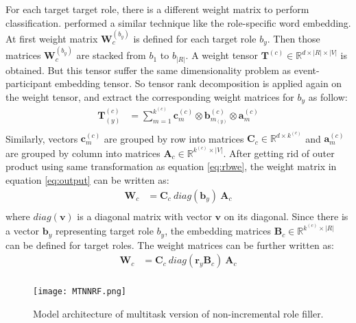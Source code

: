 \documentclass[a4paper]{article}
\begin{document}
For each target target role, there is a different weight matrix to perform classification. \citet{tilk2016event} performed a similar technique like the role-specific word embedding. At first weight matrix $\mathbf{W}_c^{(b_y)}$ is defined for each target role $b_y$. Then those matrices $\mathbf{W}_c^{(b_y)}$ are stacked from $b_1$ to $b_{|R|}$. A weight tensor $\mathbf{T}^{(c)} \in \mathbb{R}^{d \times |R| \times |V|}$ is obtained. But this tensor suffer the same dimensionality problem as event-participant embedding tensor. So tensor rank decomposition is applied again on the weight tensor, and extract the corresponding weight matrices for $b_y$ as follow: 
\begin{equation} \label{eq:trd_cls}
\begin{aligned}
    \mathbf{T}_{(y)}^{(c)}
        &= \sum_{m=1}^{k^{(c)}} \mathbf{c}_{m}^{(c)} \otimes \mathbf{b}_{m_{(y)}}^{(c)} \otimes \mathbf{a}_m^{(c)} \\
\end{aligned}
\end{equation}
Similarly, vectors $\mathbf{c}_{m}^{(c)}$ are grouped by row into matrices $\mathbf{C}_c \in \mathbb{R}^{d \times k^{(c)}}$ and $\mathbf{a}_m^{(c)}$ are grouped by column into matrices $\mathbf{A}_c \in \mathbb{R}^{k^{(c)} \times |V|}$. After getting rid of outer product using same transformation as equation \eqref{eq:rbwe}, the weight matrix in equation \eqref{eq:output}  can be written as:
\begin{equation} \label{eq:cls}
\begin{aligned}
    \mathbf{W}_c
        &= \mathbf{C}_c \ diag(\mathbf{b}_y) \ \mathbf{A}_c \\
\end{aligned}
\end{equation}
where $diag(\mathbf{v})$ is a diagonal matrix with vector $\mathbf{v}$ on its diagonal. Since there is a vector $\mathbf{b}_y$ representing target role $b_y$, the embedding matrices $\mathbf{B}_c \in \mathbb{R}^{k^{(c)} \times |R|}$ can be defined for target roles. The weight matrices can be further written as:
\begin{equation} \label{eq:cls_temb}
\begin{aligned}
    \mathbf{W}_c
        &= \mathbf{C}_c \ diag(\mathbf{r}_y \mathbf{B}_c) \ \mathbf{A}_c \\
\end{aligned}
\end{equation}


\begin{figure}[t]
\centering
\texttt{[image: MTNNRF.png]}
\caption{\label{fig:MTNNRF} Model architecture of multitask version of non-incremental role filler.}
\end{figure}
\end{document}
